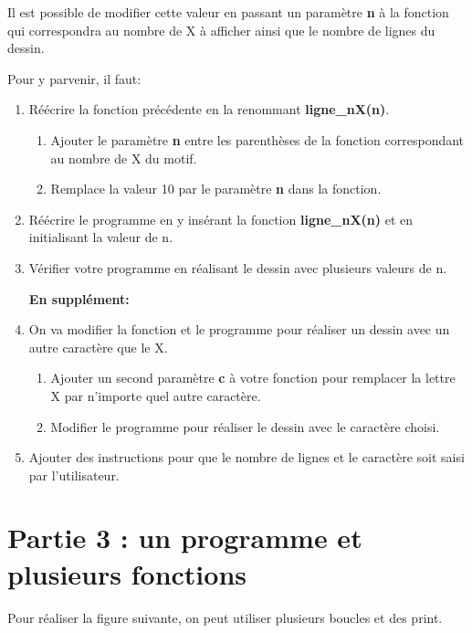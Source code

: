 \documentclass[11pt,a4paper]{article}
\begin{document}
Il est possible de modifier cette valeur en passant un paramètre \textbf{n} à la fonction qui correspondra au nombre de X à afficher ainsi que le nombre de lignes du dessin.\medskip

\noindent Pour y parvenir, il faut:
\begin{enumerate}
\item Réécrire la fonction précédente en la renommant \textbf{ligne\_nX(n)}.
\begin{enumerate}
\item Ajouter le paramètre \textbf{n} entre les parenthèses de la fonction correspondant au nombre de X du motif.
\item Remplace la valeur 10 par le paramètre \textbf{n} dans la fonction.
\end{enumerate} 
\item Réécrire le programme en y insérant la fonction \textbf{ligne\_nX(n)} et en initialisant la valeur de n.
\item Vérifier votre programme en réalisant le dessin avec plusieurs valeurs de n.\medskip

\textbf{En supplément:}

\item On va modifier la fonction et le programme pour réaliser un dessin avec un autre caractère que le X.
\begin{enumerate}
\item  Ajouter un second paramètre \textbf{c} à votre fonction pour remplacer la lettre X par n'importe quel autre caractère.
\item Modifier le programme pour réaliser le dessin avec le caractère choisi.
\end{enumerate}
\item Ajouter des instructions pour que le nombre de lignes et le caractère soit saisi par l'utilisateur.
\end{enumerate}

\newpage
\section*{Partie 3 : un programme et plusieurs fonctions}

Pour réaliser la figure suivante, on peut utiliser plusieurs boucles et des print. 
\end{document}
